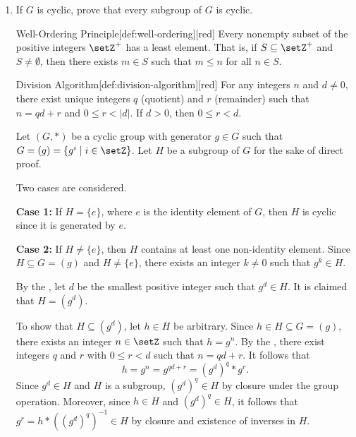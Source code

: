 \begin{enumerate}
\begin{enumerate}
\begin{subdisprove}
      Therefore, by counterexample, the statement that an abelian group is cyclic is false.
    \end{subdisprove}
  \end{enumerate}




  \newpage
  \item If $G$ is cyclic, prove that every subgroup of $G$ is cyclic.
  \begin{define}{Well-Ordering Principle}[def:well-ordering][red]
    Every nonempty subset of the positive integers $\setZ^+$ has a least element. 
    That is, if $S \subseteq \setZ^+$ and $S \neq \emptyset$, then there exists $m \in S$ such that $m \leq n$ for all $n \in S$.
  \end{define}
  \begin{define}{Division Algorithm}[def:division-algorithm][red]
    For any integers $n$ and $d \neq 0$, there exist unique integers $q$ (quotient) and $r$ (remainder) such that 
    $n = qd + r$ and $0 \leq r < |d|$. If $d > 0$, then $0 \leq r < d$.
  \end{define}
  \begin{subprove}
    Let $(G, *)$ be a cyclic group with generator $g \in G$ such that $G = (g) = \{g^i \mid i \in \setZ\}$.
    Let $H$ be a subgroup of $G$ for the sake of direct proof.
    
    Two cases are considered.
    
    \textbf{Case 1:} If $H = \{e\}$, where $e$ is the identity element of $G$, then $H$ is cyclic since it is generated by $e$.
    
    \textbf{Case 2:} If $H \neq \{e\}$, then $H$ contains at least one non-identity element.
    Since $H \subseteq G = (g)$ and $H \neq \{e\}$, there exists an integer $k \neq 0$ such that $g^k \in H$.
    
    By the , let $d$ be the smallest positive integer such that $g^d \in H$.
    It is claimed that $H = (g^d)$.
    
    To show that $H \subseteq (g^d)$, let $h \in H$ be arbitrary.
    Since $h \in H \subseteq G = (g)$, there exists an integer $n \in \setZ$ such that $h = g^n$.
    By the , there exist integers $q$ and $r$ with $0 \leq r < d$ such that $n = qd + r$.
    It follows that
    \[
      h = g^n = g^{qd + r} = (g^d)^q * g^r.
    \]
    Since $g^d \in H$ and $H$ is a subgroup, $(g^d)^q \in H$ by closure under the group operation.
    Moreover, since $h \in H$ and $(g^d)^q \in H$, it follows that $g^r = h * ((g^d)^q)^{-1} \in H$ by closure and existence of inverses in $H$.
    

\end{subprove}
\end{enumerate}
